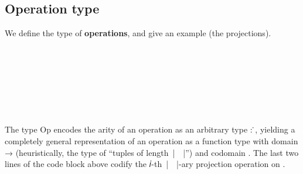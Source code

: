 \documentclass[sigplan,screen]{acmart}
\newcommand\ab[1]{\AgdaBound{#1}}
\begin{document}
\subsection{Operation type}

We define the type of \textbf{operations}, and give an example (the projections).

\begin{code}%
\>[0]\<%
\\
\>[0]\AgdaSpace{}%
\AgdaSymbol{:}\AgdaSpace{}%
\AgdaSpace{}%
\AgdaSpace{}%
\AgdaSpace{}%
\AgdaSpace{}%
\AgdaSpace{}%
\AgdaSpace{}%
\AgdaSpace{}%
\AgdaSpace{}%
\AgdaSpace{}%
\<%
\\
\>[0]\AgdaSpace{}%
\AgdaSpace{}%
\AgdaSpace{}%
\AgdaSymbol{=}\AgdaSpace{}%
\AgdaSymbol{(}\AgdaSpace{}%
\AgdaSpace{}%
\AgdaSymbol{)}\AgdaSpace{}%
\AgdaSpace{}%
\<%
\\
%
\\[\AgdaEmptyExtraSkip]%
\>[0]\<%
\\
\>[0]\AgdaSpace{}%
\AgdaSymbol{:}\AgdaSpace{}%
\AgdaSymbol{\{}\AgdaSpace{}%
\AgdaSymbol{:}\AgdaSpace{}%
\AgdaSpace{}%
\AgdaSpace{}%
\AgdaSymbol{\}}\AgdaSpace{}%
\AgdaSymbol{\{}\AgdaSpace{}%
\AgdaSymbol{:}\AgdaSpace{}%
\AgdaSpace{}%
\AgdaSpace{}%
\AgdaSymbol{\}}\AgdaSpace{}%
\AgdaSpace{}%
\AgdaSpace{}%
\AgdaSpace{}%
\AgdaSpace{}%
\AgdaSpace{}%
\<%
\\
\>[0]\AgdaSpace{}%
\AgdaSpace{}%
\AgdaSpace{}%
\AgdaSymbol{=}\AgdaSpace{}%
\AgdaSpace{}%
\<%
\end{code}
The type Op encodes the arity of an operation as an arbitrary type \ab 𝐼 : \ab 𝓥 ̇, yielding a completely general representation of an operation as a function type with domain \ab 𝐼 → \ab 𝐴 (heuristically, the type of ``tuples of length~|~\ab 𝐼~|'') and codomain \ab 𝐴. The last two lines of the code block above codify the 𝑖-th~|~\ab 𝐼~|-ary projection operation on \ab 𝐴.
\end{document}
